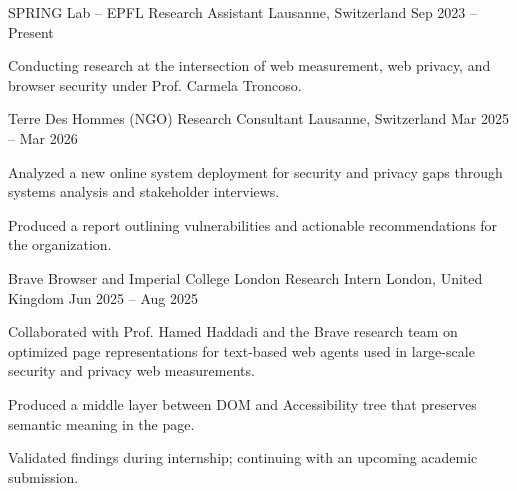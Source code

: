 

\begin{cventries}


\cventry
    {SPRING Lab -- EPFL} %
    {Research Assistant} %
    {Lausanne, Switzerland} %
    {Sep 2023 -- Present} %
    {
      \begin{cvitems} %
        \item {Conducting research at the intersection of web measurement, web privacy, and browser security under Prof. Carmela Troncoso.}
      \end{cvitems}
    }

\cventry
    {Terre Des Hommes (NGO)} %
    {Research Consultant} %
    {Lausanne, Switzerland} %
    {Mar 2025 -- Mar 2026} %
    {
      \begin{cvitems} %
        \item {Analyzed a new online system deployment for security and privacy gaps through systems analysis and stakeholder interviews.}
        \item {Produced a report outlining vulnerabilities and actionable recommendations for the organization.}
      \end{cvitems}
    }

\cventry
    {Brave Browser and Imperial College London} %
    {Research Intern} %
    {London, United Kingdom} %
    {Jun 2025 -- Aug 2025} %
    {
      \begin{cvitems} %
        \item {Collaborated with Prof. Hamed Haddadi and the Brave research team on optimized page representations for text-based web agents used in large-scale security and privacy web measurements.}
        \item {Produced a middle layer between DOM and Accessibility tree that preserves semantic meaning in the page.}
        \item {Validated findings during internship; continuing with an upcoming academic submission.}
      \end{cvitems}
    }


\end{cventries}
